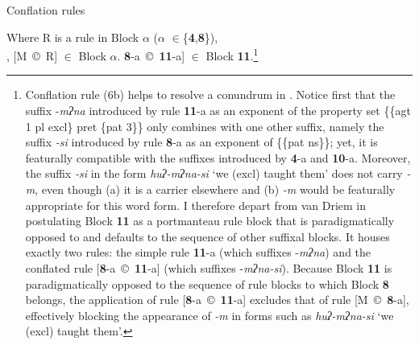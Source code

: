 \documentclass[output=paper,
modfonts
]{LSP/langsci}
\begin{document}
\ea Conflation rules %
    \label{ex:6}
    \begin{xlist}
    \ex Where R is a rule in Block \textbf{$\alpha $} (\textbf{$\alpha $} ${\in}$\{\textbf{4},\textbf{8}\}), \\
    		[Ŋ~©~R],  [M~©~R]  ${\in}$ Block \textbf{$\alpha $}.
     \ex  {[}\textbf{8}\nobreakdash-a~©~\textbf{11}\nobreakdash-a] ${\in}$ Block \textbf{11}.\footnote{Conflation rule (6b) helps to resolve a conundrum in .  Notice first that the suffix -\textit{mʔna} introduced by rule \textbf{11}{}-a as an exponent of the property set \{\{agt 1 pl excl\} pret \{pat 3\}\} only combines with one other suffix, namely the suffix \textit{{}-si}  introduced by rule \textbf{8}{}-a as an exponent of \{\{pat\textsc{} ns\}\}; yet, it is featurally compatible with the suffixes introduced by \textbf{4}{}-a and \textbf{10}{}-a.  Moreover, the suffix \textit{{}-si} in the form \textit{huʔ\nobreakdash-mʔna\nobreakdash-si} ‘we (excl) taught them’ does not carry \textit{{}-m}, even though (a) it is a carrier elsewhere and (b) \textit{{}-m} would be featurally appropriate for this word form.  I therefore depart from van Driem in postulating Block \textbf{11} as a portmanteau rule block \citep[141]{Stump2001} that is paradigmatically opposed to and defaults to the sequence of other suffixal blocks.  It houses exactly two rules:  the simple rule \textbf{11}{}-a (which suffixes \nobreakdash-\textit{mʔna}) and the conflated rule [\textbf{8}\nobreakdash-a~©~\textbf{11}\nobreakdash-a] (which suffixes -\textit{mʔna-si}).  Because Block \textbf{11} is paradigmatically opposed to the sequence of rule blocks to which Block \textbf{8} belongs, the application of rule [\textbf{8}\nobreakdash-a~©~\textbf{11}\nobreakdash-a] excludes that of rule [M~©~\textbf{8}\nobreakdash-a], effectively blocking the appearance of \textit{{}-m} in forms such as \textit{huʔ\nobreakdash-mʔna\nobreakdash-si} ‘we (excl) taught them’.}
     \end{xlist}
\z
\end{document}
